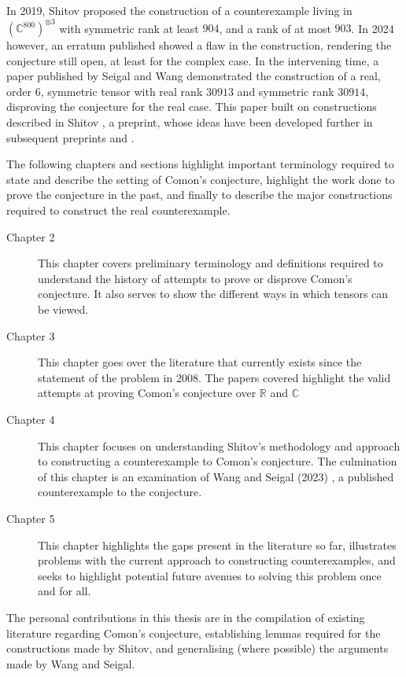 \documentclass[12pt,a4paper,oneside]{book}
\def\reals{\mathbb{R}} %
\def\complex{\mathbb{C}} %
\theoremstyle{definition}
\begin{document}
In 2019, Shitov \cite{shitov_counterexample_2018} proposed the construction of a counterexample living in $(\complex^{800})^{\otimes 3}$ with symmetric rank at least $904$, and a rank of at most $903$. In 2024 however, an erratum published \cite{draisma_erratum_2024} showed a flaw in the construction, rendering the conjecture still open, at least for the complex case. In the intervening time, a paper published by Seigal and Wang \cite{wang_lower_2023} demonstrated the construction of a real, order $6$, symmetric tensor with real rank $30913$ and symmetric rank $30914$, disproving the conjecture for the real case. This paper built on constructions described in Shitov \cite{shitov_comons_2020}, a preprint, whose ideas have been developed further in subsequent preprints \cite{shitov_higher_2024} and \cite{shitov_higher_2024-1}.

The following chapters and sections highlight important terminology required to state and describe the setting of Comon's conjecture, highlight the work done to prove the conjecture in the past, and finally to describe the major constructions required to construct the real counterexample. 
\begin{description}
    \item[Chapter 2] This chapter covers preliminary terminology and definitions required to understand the history of attempts to prove or disprove Comon's conjecture. It also serves to show the different ways in which tensors can be viewed.
    \item[Chapter 3] This chapter goes over the literature that currently exists since the statement of the problem in 2008. The papers covered highlight the valid attempts at proving Comon's conjecture over $\reals$ and $\complex$
    \item[Chapter 4] This chapter focuses on understanding Shitov's methodology and approach to constructing a counterexample to Comon's conjecture. The culmination of this chapter is an examination of Wang and Seigal (2023) \cite{wang_lower_2023}, a published counterexample to the conjecture. 
    \item[Chapter 5] This chapter highlights the gaps present in the literature so far, illustrates problems with the current approach to constructing counterexamples, and seeks to highlight potential future avenues to solving this problem once and for all.   
\end{description}

The personal contributions in this thesis are in the compilation of existing literature regarding Comon's conjecture, establishing lemmas required for the constructions made by Shitov, and generalising (where possible) the arguments made by Wang and Seigal. 
\end{document}
